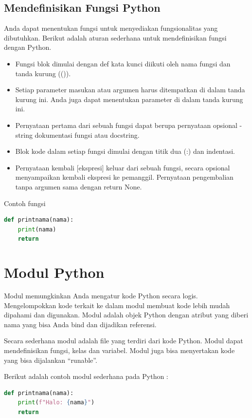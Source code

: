 \subsection{Mendefinisikan Fungsi Python}
Anda dapat menentukan fungsi untuk menyediakan fungsionalitas yang dibutuhkan. Berikut adalah aturan sederhana untuk mendefinisikan fungsi dengan Python.
\begin{itemize}
\item Fungsi blok dimulai dengan def kata kunci diikuti oleh nama fungsi dan tanda kurung (()).
\item Setiap parameter masukan atau argumen harus ditempatkan di dalam tanda kurung ini. Anda juga dapat menentukan parameter di dalam tanda kurung ini.
\item Pernyataan pertama dari sebuah fungsi dapat berupa pernyataan opsional - string dokumentasi fungsi atau docstring.
\item Blok kode dalam setiap fungsi dimulai dengan titik dua (:) dan indentasi.
\item Pernyataan kembali [ekspresi] keluar dari sebuah fungsi, secara opsional menyampaikan kembali ekspresi ke pemanggil. Pernyataan pengembalian tanpa argumen sama dengan return None.
\end{itemize}

Contoh fungsi

\begin{lstlisting}[language=Python]
def printnama(nama):
    print(nama)
    return
\end{lstlisting}

\section{Modul Python}
Modul memungkinkan Anda mengatur kode Python secara logis. Mengelompokkan kode terkait ke dalam modul membuat kode lebih mudah dipahami dan digunakan. Modul adalah objek Python dengan atribut yang diberi nama yang bisa Anda bind dan dijadikan referensi.

Secara sederhana modul adalah file yang terdiri dari kode Python. Modul dapat mendefinisikan fungsi, kelas dan variabel. Modul juga bisa menyertakan kode yang bisa dijalankan “runable”.

Berikut adalah contoh modul sederhana pada Python :
\begin{lstlisting}[language=Python]
def printnama(nama):
    print(f"Halo: {nama}")
    return
\end{lstlisting}

